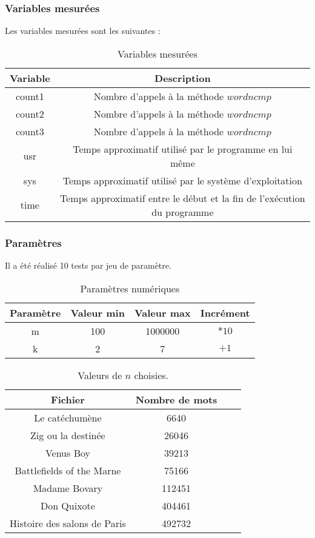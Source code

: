 \subsubsection{Variables mesurées}

Les variables mesurées sont les suivantes :

\begin{table}[h!]
	\centering
	\caption{Variables mesurées}
	\label{tab:variablesMesureesExperience}
	\begin{tabular}{c|c}
		\toprule
		Variable & Description\\
		\midrule
		count1 & Nombre d'appels à la méthode $wordncmp$\\
		count2 & Nombre d'appels à la méthode $wordncmp$\\
		count3 & Nombre d'appels à la méthode $wordncmp$\\
		usr & Temps approximatif utilisé par le programme en lui même\\
		sys & Temps approximatif utilisé par le système d'exploitation\\
		time & Temps approximatif entre le début et la fin de l'exécution du programme\\
		\bottomrule
	\end{tabular}
\end{table}

\subsubsection{Paramètres}
Il a été réalisé 10 tests par jeu de paramètre.

\begin{table}[h!]
	\centering
	\caption{Paramètres numériques}
	\label{tab:parametresNumeriquesRealisee}
	\begin{tabular}{c|ccc}
		\toprule
		Paramètre & Valeur min & Valeur max & Incrément\\
		\midrule
		m & 100 & 1000000 & $*10$\\
		k & 2 & 7 & $+1$\\
		\bottomrule
	\end{tabular}
\end{table}

\begin{table}[h!]
	\centering
	\caption{Valeurs de $n$ choisies.}
	\label{tab:valeursDeNChoisiesRealisee}
	\begin{tabular}{c|ccc}
		\toprule
		Fichier & Nombre de mots\\
		\midrule
		Le catéchumène & 6640\\
		Zig ou la destinée & 26046\\
		Venus Boy & 39213\\
		Battlefields of the Marne & 75166\\
		Madame Bovary & 112451\\
		Don Quixote & 404461\\
		Histoire des salons de Paris & 492732\\
		\bottomrule
	\end{tabular}
\end{table}


